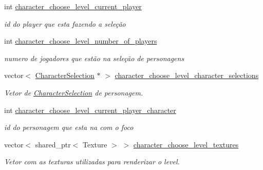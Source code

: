 \begin{DoxyCompactItemize}
\mbox{\label{classCharacterChooseLevel_af2366120c236a7c1b5b4077e6a1b29ab}} 
int \mbox{\hyperlink{classCharacterChooseLevel_af2366120c236a7c1b5b4077e6a1b29ab}{character\+\_\+choose\+\_\+level\+\_\+current\+\_\+player}}
\begin{DoxyCompactList}\small\item\em id do player que esta fazendo a seleção \end{DoxyCompactList}\item 
\mbox{\label{classCharacterChooseLevel_a5fa43a1808568de8a7f0fad0f089b55f}} 
int \mbox{\hyperlink{classCharacterChooseLevel_a5fa43a1808568de8a7f0fad0f089b55f}{character\+\_\+choose\+\_\+level\+\_\+number\+\_\+of\+\_\+players}}
\begin{DoxyCompactList}\small\item\em numero de jogadores que estão na seleção de personagens \end{DoxyCompactList}\item 
\mbox{\label{classCharacterChooseLevel_af571b4c68b3aba7dff69c8c9b416fab4}} 
vector$<$ \mbox{\hyperlink{classCharacterSelection}{Character\+Selection}} $\ast$ $>$ \mbox{\hyperlink{classCharacterChooseLevel_af571b4c68b3aba7dff69c8c9b416fab4}{character\+\_\+choose\+\_\+level\+\_\+character\+\_\+selections}}
\begin{DoxyCompactList}\small\item\em Vetor de \mbox{\hyperlink{classCharacterSelection}{Character\+Selection}} de personagem. \end{DoxyCompactList}\item 
\mbox{\label{classCharacterChooseLevel_a5ff1d679ef4ef8bb465f9a3a030a5ee0}} 
int \mbox{\hyperlink{classCharacterChooseLevel_a5ff1d679ef4ef8bb465f9a3a030a5ee0}{character\+\_\+choose\+\_\+level\+\_\+current\+\_\+player\+\_\+character}}
\begin{DoxyCompactList}\small\item\em id do personagem que esta na com o foco \end{DoxyCompactList}\item 
\mbox{\label{classCharacterChooseLevel_af3e2b23ae784c1fa74e5e1d9d2f33cde}} 
vector$<$ shared\+\_\+ptr$<$ Texture $>$ $>$ \mbox{\hyperlink{classCharacterChooseLevel_af3e2b23ae784c1fa74e5e1d9d2f33cde}{character\+\_\+choose\+\_\+level\+\_\+textures}}
\begin{DoxyCompactList}\small\item\em Vetor com as texturas utilizadas para renderizar o level. \end{DoxyCompactList}\end{DoxyCompactItemize}


